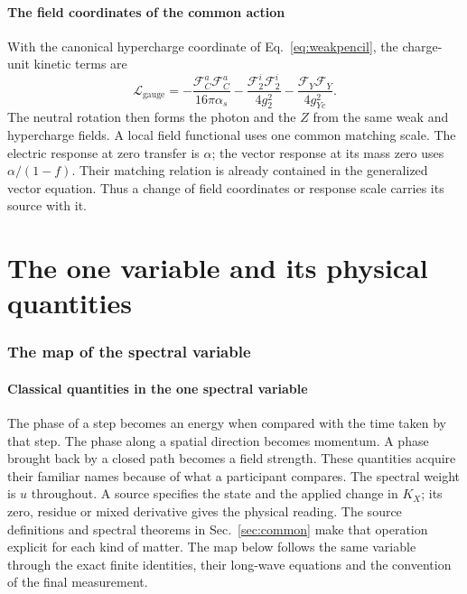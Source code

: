 \documentclass[aps,prx,onecolumn,10pt,notitlepage,nofootinbib,longbibliography]{revtex4-2}
\numberwithin{equation}{section}
\numberwithin{table}{section}
\begin{document}
\subsection{The field coordinates of the common action}
With the canonical hypercharge coordinate of Eq.~\eqref{eq:weakpencil}, the charge-unit kinetic terms are
\begin{equation}
 \mathcal L_{\mathrm{gauge}}=
 -\frac{\mathcal F_C^a\mathcal F_C^a}{16\pi\alpha_s}
 -\frac{\mathcal F_2^i\mathcal F_2^i}{4g_2^2}
 -\frac{\mathcal F_Y\mathcal F_Y}{4g_{Yc}^2}.
 \label{eq:commongaugebasis}
\end{equation}
The neutral rotation then forms the photon and the $Z$ from the same weak and hypercharge fields. A local field functional uses one common matching scale. The electric response at zero transfer is $\alpha$; the vector response at its mass zero uses $\alpha/(1-f)$. Their matching relation is already contained in the generalized vector equation. Thus a change of field coordinates or response scale carries its source with it.

\newpage
\part{The one variable and its physical quantities}\label{part:maps}

\section{The map of the spectral variable}
\label{sec:maps}
\label{sec:classical}

\subsection{Classical quantities in the one spectral variable}
\label{sec:variablemap}

The phase of a step becomes an energy when compared with the time taken by that step. The phase along a spatial direction becomes momentum. A phase brought back by a closed path becomes a field strength. These quantities acquire their familiar names because of what a participant compares. The spectral weight is $u$ throughout. A source specifies the state and the applied change in $K_X$; its zero, residue or mixed derivative gives the physical reading. The source definitions and spectral theorems in Sec.~\ref{sec:common} make that operation explicit for each kind of matter. The map below follows the same variable through the exact finite identities, their long-wave equations and the convention of the final measurement.\cite{Repository}
\end{document}
